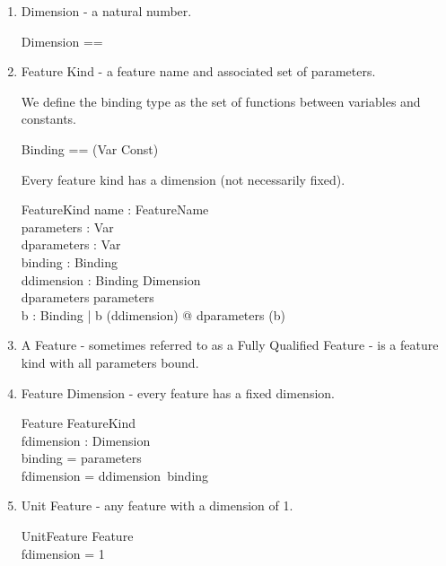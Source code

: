 \documentclass[11pt]{article}
\begin{document}
\begin{enumerate}
\item \textsf{Dimension} - a natural number.

\begin{zed}
	Dimension ==	 \nat
\end{zed}

\item \textsf{Feature Kind} - a feature name and associated set of parameters. 

\begin{zed}
\end{zed}

We define the binding type as the set of functions between variables and constants. 

\begin{zed}
	Binding == \power (Var \cross Const) 
\end{zed}

Every feature kind has a dimension (not necessarily fixed). 

\begin{schema}{FeatureKind}
	name :  FeatureName \\
	parameters : \power Var \\
	dparameters : \power Var \\
	binding : Binding \\
	ddimension : Binding \pfun Dimension  \\ 
\where
	dparameters  \subseteq parameters  \\
	\forall b : Binding |  b \in (\dom ddimension) @ dparameters \subseteq  (\dom b) 
\end{schema}

\item A \textsf{Feature} -  sometimes referred to as a Fully Qualified Feature - is  a feature kind with all parameters bound. 

\item \textsf{Feature Dimension} - every feature has a fixed  dimension. 

\begin{schema}{Feature}
	FeatureKind \\
	fdimension : Dimension  \\
\where
	\dom binding = parameters \\
	fdimension = ddimension~binding
\end{schema}

\item \textsf{Unit Feature} - any feature with a dimension of 1.
	
\begin{schema}{UnitFeature}
	Feature \\
\where
	fdimension = 1
\end{schema}


\end{enumerate}
\end{document}
